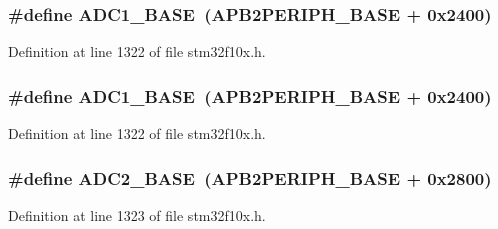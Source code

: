 \subsubsection[{\texorpdfstring{A\+D\+C1\+\_\+\+B\+A\+SE}{ADC1_BASE}}]{\setlength{\rightskip}{0pt plus 5cm}\#define A\+D\+C1\+\_\+\+B\+A\+SE~({\bf A\+P\+B2\+P\+E\+R\+I\+P\+H\+\_\+\+B\+A\+SE} + 0x2400)}\hypertarget{group___peripheral__memory__map_ga695c9a2f892363a1c942405c8d351b91}{}\label{group___peripheral__memory__map_ga695c9a2f892363a1c942405c8d351b91}


Definition at line 1322 of file stm32f10x.\+h.

\subsubsection[{\texorpdfstring{A\+D\+C1\+\_\+\+B\+A\+SE}{ADC1_BASE}}]{\setlength{\rightskip}{0pt plus 5cm}\#define A\+D\+C1\+\_\+\+B\+A\+SE~({\bf A\+P\+B2\+P\+E\+R\+I\+P\+H\+\_\+\+B\+A\+SE} + 0x2400)}\hypertarget{group___peripheral__memory__map_ga695c9a2f892363a1c942405c8d351b91}{}\label{group___peripheral__memory__map_ga695c9a2f892363a1c942405c8d351b91}


Definition at line 1322 of file stm32f10x.\+h.

\subsubsection[{\texorpdfstring{A\+D\+C2\+\_\+\+B\+A\+SE}{ADC2_BASE}}]{\setlength{\rightskip}{0pt plus 5cm}\#define A\+D\+C2\+\_\+\+B\+A\+SE~({\bf A\+P\+B2\+P\+E\+R\+I\+P\+H\+\_\+\+B\+A\+SE} + 0x2800)}\hypertarget{group___peripheral__memory__map_ga6544abc57f9759f610eee09a02442ae6}{}\label{group___peripheral__memory__map_ga6544abc57f9759f610eee09a02442ae6}


Definition at line 1323 of file stm32f10x.\+h.

